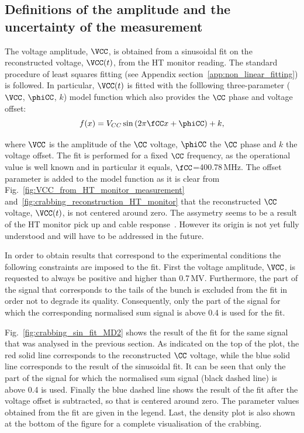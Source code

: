 \subsection{Definitions of the amplitude and the uncertainty of the measurement}\label{subsec:def_amplt_uncertainty}
The voltage amplitude, $\VCC$, is obtained from a sinusoidal fit on the reconstructed voltage, $\VCC (t)$, from the HT monitor reading. The standard procedure of least squares fitting (see Appendix section~\ref{app:non_linear_fitting}) is followed. In particular, $\VCC (t)$ is fitted with the folllowing three-parameter ($\VCC$, $\phiCC$, $k$) model function which also provides the $\CC$ phase and voltage offset:
\begin{equation}\label{eq:sin_fit_cc}
   f(x) = V_{CC}\sin{(2\pi \fCC x + \phiCC)} + k ,
\end{equation}

where $\VCC$ is the amplitude of the $\CC$ voltage, $\phiCC$ the $\CC$ phase and
$k$ the voltage offset. The fit is performed for a fixed $\CC$ frequency, as the operational value is well known and in particular it equals, $\fCC$=400.78\,MHz. The offset parameter is added to the model function as it is clear from Fig.~\ref{fig:VCC_from_HT_monitor_measurement} and~\ref{fig:crabbing_reconstruction_HT_monitor} that the reconstructed $\CC$ voltage, $\VCC(t)$, is not centered around zero. The assymetry seems to be a result of the HT monitor pick up and cable response~\cite{Levens_WP2_HT_CC_diagnostic}. However its origin is not yet fully understood and will have to be addressed in the future. %

In order to obtain results that correspond to the experimental conditions the following constraints are imposed to the fit. First the voltage amplitude, $\VCC$, is requested to always be positive and higher than 0.7\,MV. Furthermore, the part of the signal that corresponds to the tails of the bunch is excluded from the fit in order not to degrade its quality. Consequently, only the part of the signal for which the corresponding normalised sum signal is above 0.4 is used for the fit. 

Fig.~\ref{fig:crabbing_sin_fit_MD2} shows the result of the fit for the same signal that was analysed in the previous section. As indicated on the top of the plot, the red solid line corresponds to the reconstructed $\CC$ voltage, while the blue solid line corresponds to the result of the sinusoidal fit. It can be seen that only the part of the signal for which the normalised sum signal (black dashed line) is above 0.4 is used. Finally the blue dashed line shows the result of the fit after the voltage offset is subtracted, so that is centered around zero. The parameter values obtained from the fit are given in the legend. Last, the density plot is also shown at the bottom of the figure for a complete visualisation of the crabbing. 

